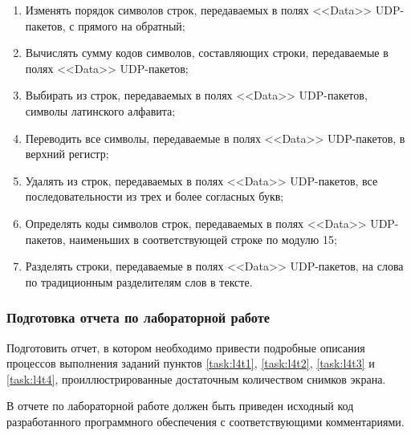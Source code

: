 	\begin{enumerate}[1.]

		\item Изменять порядок символов строк, передаваемых в полях <<Data>> UDP-пакетов, с прямого на обратный;
		\item Вычислять сумму кодов символов, составляющих строки, передаваемые в полях <<Data>> UDP-пакетов;
		\item Выбирать из строк, передаваемых в полях <<Data>> UDP-пакетов, символы латинского алфавита;
		\item Переводить все символы, передаваемые в полях <<Data>> UDP-пакетов, в верхний регистр;
		\item Удалять из строк, передаваемых в полях <<Data>> UDP-пакетов, все последовательности из трех и более
		согласных букв;
		\item Определять коды символов строк, передаваемых в полях <<Data>> UDP-пакетов, наименьших в соответствующей
		строке по модулю 15;
		\item Разделять строки, передаваемые в полях <<Data>> UDP-пакетов, на слова по традиционным разделителям
		слов в тексте.

	\end{enumerate}

\subsubsection{Подготовка отчета по лабораторной работе}

	Подготовить отчет, в котором необходимо привести подробные описания процессов выполнения заданий пунктов
	\ref{task:l4t1}, \ref{task:l4t2}, \ref{task:l4t3} и \ref{task:l4t4}, проиллюстрированные достаточным
	количеством снимков экрана.

	В отчете по лабораторной работе должен быть приведен исходный код разработанного программного обеспечения
	с соответствующими комментариями.

